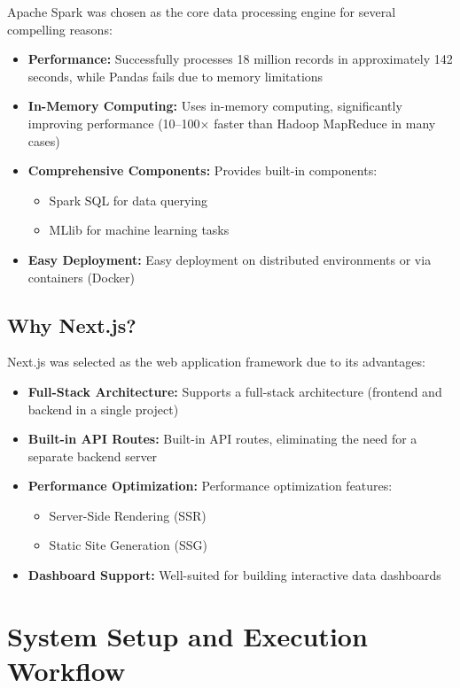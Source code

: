 \documentclass[12pt,a4paper]{report}
\begin{document}
Apache Spark was chosen as the core data processing engine for several compelling reasons:

\begin{itemize}
    \item \textbf{Performance:} Successfully processes 18 million records in approximately 142 seconds, while Pandas fails due to memory limitations
    \item \textbf{In-Memory Computing:} Uses in-memory computing, significantly improving performance (10--100$\times$ faster than Hadoop MapReduce in many cases)
    \item \textbf{Comprehensive Components:} Provides built-in components:
    \begin{itemize}
        \item Spark SQL for data querying
        \item MLlib for machine learning tasks
    \end{itemize}
    \item \textbf{Easy Deployment:} Easy deployment on distributed environments or via containers (Docker)
\end{itemize}

\subsection{Why Next.js?}

Next.js was selected as the web application framework due to its advantages:

\begin{itemize}
    \item \textbf{Full-Stack Architecture:} Supports a full-stack architecture (frontend and backend in a single project)
    \item \textbf{Built-in API Routes:} Built-in API routes, eliminating the need for a separate backend server
    \item \textbf{Performance Optimization:} Performance optimization features:
    \begin{itemize}
        \item Server-Side Rendering (SSR)
        \item Static Site Generation (SSG)
    \end{itemize}
    \item \textbf{Dashboard Support:} Well-suited for building interactive data dashboards
\end{itemize}

\section{System Setup and Execution Workflow}
\end{document}
